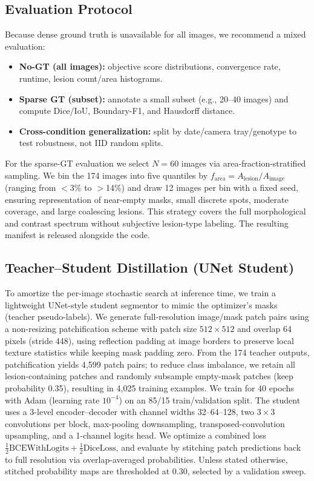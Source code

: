 \documentclass[journal]{IEEEtran}
\begin{document}
\subsection{Evaluation Protocol}
Because dense ground truth is unavailable for all images, we recommend a mixed evaluation:
\begin{itemize}
    \item \textbf{No-GT (all images):} objective score distributions, convergence rate, runtime, lesion count/area histograms.
    \item \textbf{Sparse GT (subset):} annotate a small subset (e.g., 20--40 images) and compute Dice/IoU, Boundary-F1, and Hausdorff distance.
    \item \textbf{Cross-condition generalization:} split by date/camera tray/genotype to test robustness, not IID random splits.
\end{itemize}
For the sparse-GT evaluation we select $N{=}60$ images via area-fraction-stratified sampling. We bin the 174 images into five quantiles by $f_{\mathrm{area}} = A_{\mathrm{lesion}}/A_{\mathrm{image}}$ (ranging from $<$3\% to $>$14\%) and draw 12 images per bin with a fixed seed, ensuring representation of near-empty masks, small discrete spots, moderate coverage, and large coalescing lesions. This strategy covers the full morphological and contrast spectrum without subjective lesion-type labeling. The resulting manifest is released alongside the code.

\subsection{Teacher--Student Distillation (UNet Student)}
To amortize the per-image stochastic search at inference time, we train a lightweight UNet-style student segmentor to mimic the optimizer's masks (teacher pseudo-labels).
We generate full-resolution image/mask patch pairs using a non-resizing patchification scheme with patch size $512\times512$ and overlap 64 pixels (stride 448), using reflection padding at image borders to preserve local texture statistics while keeping mask padding zero.
From the 174 teacher outputs, patchification yields 4{,}599 patch pairs; to reduce class imbalance, we retain all lesion-containing patches and randomly subsample empty-mask patches (keep probability 0.35), resulting in 4{,}025 training examples.
We train for 40 epochs with Adam (learning rate $10^{-4}$) on an 85/15 train/validation split.
The student uses a 3-level encoder--decoder with channel widths 32--64--128, two $3\times3$ convolutions per block, max-pooling downsampling, transposed-convolution upsampling, and a 1-channel logits head.
We optimize a combined loss $\tfrac12\mathrm{BCEWithLogits} + \tfrac12\mathrm{DiceLoss}$, and evaluate by stitching patch predictions back to full resolution via overlap-averaged probabilities. Unless stated otherwise, stitched probability maps are thresholded at 0.30, selected by a validation sweep.
\end{document}
